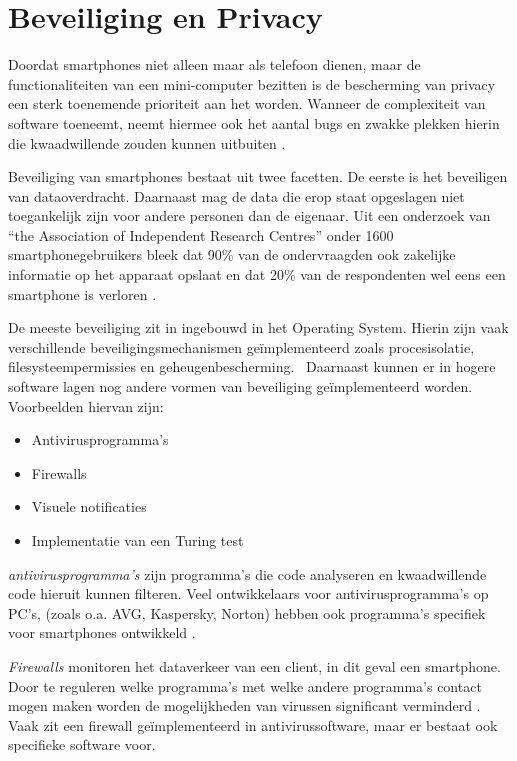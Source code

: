 \chapter{Beveiliging en Privacy}

Doordat smartphones niet alleen maar als telefoon dienen, maar de functionaliteiten van een mini-computer bezitten is de bescherming van privacy een sterk toenemende prioriteit aan het worden. Wanneer de complexiteit van software toeneemt, neemt hiermee ook het aantal bugs en zwakke plekken hierin die kwaadwillende zouden kunnen uitbuiten \citep{portokalidis2010paranoid}. 

Beveiliging van smartphones bestaat uit twee facetten. De eerste is het beveiligen van dataoverdracht. Daarnaast mag de data die erop staat opgeslagen niet toegankelijk zijn voor andere personen dan de eigenaar. Uit een onderzoek van ``the Association of Independent Research Centres'' onder 1600 smartphonegebruikers bleek dat 90\% van de ondervraagden ook zakelijke informatie op het apparaat opslaat en dat 20\% van de respondenten wel eens een smartphone is verloren \citep{charles2011}.  

De meeste beveiliging zit in ingebouwd in het Operating System. Hierin zijn vaak verschillende beveiligingsmechanismen ge\"implementeerd zoals procesisolatie, filesysteempermissies en geheugenbescherming.  Daarnaast kunnen er in hogere software lagen nog andere vormen van beveiliging ge\"implementeerd worden. Voorbeelden hiervan zijn: 

\begin{itemize}
   \item Antivirusprogramma's
   \item Firewalls
   \item Visuele notificaties
   \item Implementatie van een Turing test
\end{itemize}

\emph{antivirusprogramma's} zijn programma's die code analyseren en kwaadwillende code hieruit kunnen filteren. Veel ontwikkelaars voor antivirusprogramma's op PC's, (zoals o.a. AVG, Kaspersky, Norton) hebben ook programma's specifiek voor smartphones ontwikkeld \citep{becher2009security}. 

\emph{Firewalls} monitoren het dataverkeer van een client, in dit geval een smartphone. Door te reguleren welke programma's met welke andere programma's contact mogen maken worden de mogelijkheden van virussen significant verminderd \citep{becher2009security}. Vaak zit een firewall ge\"implementeerd in antivirussoftware, maar er bestaat ook specifieke software voor. 


